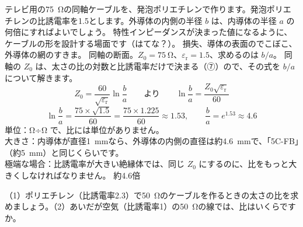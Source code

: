 \label{ph:電-13:ex2}
\begin{phreidai}[75 Ω の同軸ケーブルの太さの比]
テレビ用の\qty{75}{\ohm}の同軸ケーブルを、発泡ポリエチレンで作ります。発泡ポリエチレンの比誘電率を1.5とします。外導体の内側の半径 $b$ は、内導体の半径 $a$ の何倍にすればよいでしょう。
\phbamen
特性インピーダンスが決まった値になるように、ケーブルの形を設計する場面です（はてな？）。
\phmushi
損失、導体の表面のでこぼこ、外導体の網のすきま。
\phzu
同軸の断面。$Z_0=\qty{75}{\ohm}$、$\varepsilon_{\mathrm r}=1.5$、求めるのは $b/a$。
\phriyu
同軸の $Z_0$ は、太さの比の対数と比誘電率だけで決まる（⑦）ので、その式を $b/a$ について解きます。
\phtateru
\[Z_0=\frac{60}{\sqrt{\varepsilon_{\mathrm r}}}\ln\frac ba\qquad\text{より}\qquad\ln\frac ba=\frac{Z_0\sqrt{\varepsilon_{\mathrm r}}}{60}\]
\phtoku
\[\ln\frac ba=\frac{75\times\sqrt{1.5}}{60}=\frac{75\times1.225}{60}\approx1.53,\qquad\frac ba=e^{1.53}\approx4.6\]
\phtashikame
単位：Ω÷Ω で、比には単位がありません。\\
大きさ：内導体が直径\qty{1}{mm}なら、外導体の内側の直径は約\qty{4.6}{mm}で、「5C-FB」（約\qty{5}{mm}）と同じくらいです。\\
極端な場合：比誘電率が大きい絶縁体では、同じ $Z_0$ にするのに、比をもっと大きくしなければなりません。
\kotae 約4.6倍
\end{phreidai}
\begin{jibun}
（1）ポリエチレン（比誘電率2.3）で\qty{50}{\ohm}のケーブルを作るときの太さの比を求めましょう。（2）あいだが空気（比誘電率1）の\qty{50}{\ohm}の線では、比はいくらですか。
\end{jibun}

